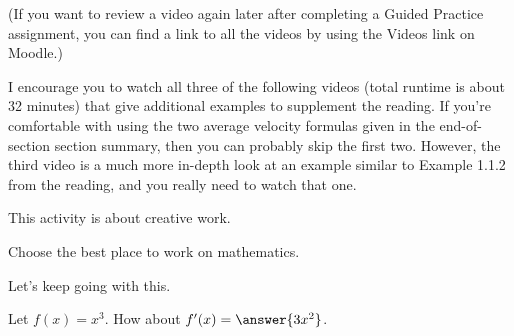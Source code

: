 \documentclass{ximera}
\begin{document}
(If you want to review a video again later after completing a Guided
Practice assignment, you can find a link to all the videos by using
the Videos link on Moodle.)

I encourage you to watch all three of the following videos (total
runtime is about 32 minutes) that give additional examples to
supplement the reading. If you're comfortable with using the two
average velocity formulas given in the end-of-section section summary, then
you can probably skip the first two. However, the third video is a
much more in-depth look at an example similar to Example 1.1.2 from the
reading, and you really need to watch that one.


This activity is about creative work.  
\begin{exercise}  
  Choose the best place to work on mathematics.  
  \begin{multipleChoice}  
  \end{multipleChoice}  
\end{exercise}

Let's keep going with this.

\begin{exercise}
  Let \(f(x) = x^3\). How about \(f'(x) = \answer{3x^2}\).
\end{exercise}
\end{document}
